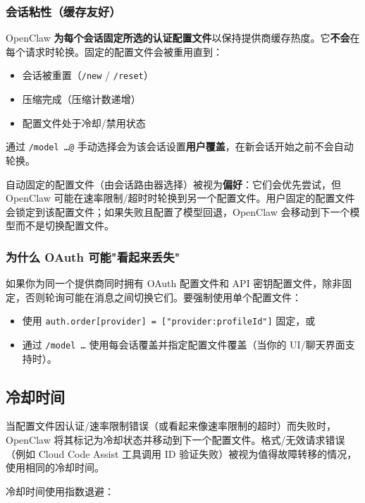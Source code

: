 \subsubsection{会话粘性（缓存友好）}


OpenClaw \textbf{为每个会话固定所选的认证配置文件}以保持提供商缓存热度。它\textbf{不会}在每个请求时轮换。固定的配置文件会被重用直到：

\begin{itemize}
  \item 会话被重置（\texttt{/new} / \texttt{/reset}）
  \item 压缩完成（压缩计数递增）
  \item 配置文件处于冷却/禁用状态
\end{itemize}


通过 \texttt{/model …@} 手动选择会为该会话设置\textbf{用户覆盖}，在新会话开始之前不会自动轮换。

自动固定的配置文件（由会话路由器选择）被视为\textbf{偏好}：它们会优先尝试，但 OpenClaw 可能在速率限制/超时时轮换到另一个配置文件。用户固定的配置文件会锁定到该配置文件；如果失败且配置了模型回退，OpenClaw 会移动到下一个模型而不是切换配置文件。

\subsubsection{为什么 OAuth 可能"看起来丢失"}


如果你为同一个提供商同时拥有 OAuth 配置文件和 API 密钥配置文件，除非固定，否则轮询可能在消息之间切换它们。要强制使用单个配置文件：

\begin{itemize}
  \item 使用 \texttt{auth.order[provider] = ["provider:profileId"]} 固定，或
  \item 通过 \texttt{/model …} 使用每会话覆盖并指定配置文件覆盖（当你的 UI/聊天界面支持时）。
\end{itemize}


\subsection{冷却时间}


当配置文件因认证/速率限制错误（或看起来像速率限制的超时）而失败时，OpenClaw 将其标记为冷却状态并移动到下一个配置文件。格式/无效请求错误（例如 Cloud Code Assist 工具调用 ID 验证失败）被视为值得故障转移的情况，使用相同的冷却时间。

冷却时间使用指数退避：

